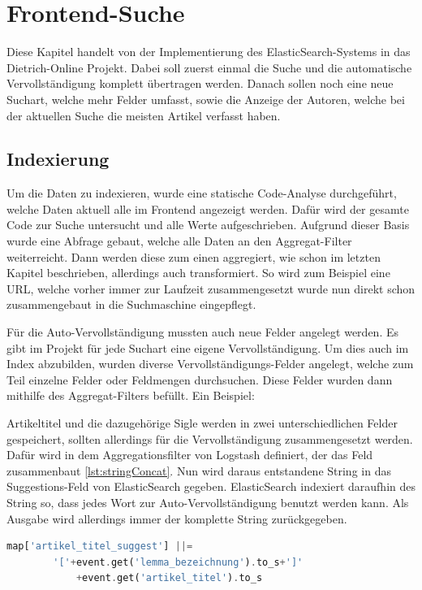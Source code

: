 \chapter{Frontend-Suche}

Diese Kapitel handelt von der Implementierung des ElasticSearch-Systems in das Dietrich-Online Projekt. Dabei soll zuerst einmal die Suche und die automatische Vervollständigung komplett übertragen werden. Danach sollen noch eine neue Suchart, welche mehr Felder umfasst, sowie die Anzeige der Autoren, welche bei der aktuellen Suche die meisten Artikel verfasst haben.

\section{Indexierung}

Um die Daten zu indexieren, wurde eine statische Code-Analyse durchgeführt, welche Daten aktuell alle im Frontend angezeigt werden. Dafür wird der gesamte Code zur Suche untersucht und alle Werte aufgeschrieben. Aufgrund dieser Basis wurde eine Abfrage gebaut, welche alle Daten an den Aggregat-Filter weiterreicht. Dann werden diese zum einen aggregiert, wie schon im letzten Kapitel beschrieben, allerdings auch transformiert. So wird zum Beispiel eine URL, welche vorher immer zur Laufzeit zusammengesetzt wurde nun direkt schon zusammengebaut in die Suchmaschine eingepflegt. 

Für die Auto-Vervollständigung mussten auch neue Felder angelegt werden. Es gibt im Projekt für jede Suchart eine eigene Vervollständigung. Um dies auch im Index abzubilden, wurden diverse Vervollständigungs-Felder angelegt, welche zum Teil einzelne Felder oder Feldmengen durchsuchen. Diese Felder wurden dann mithilfe des Aggregat-Filters befüllt. Ein Beispiel:

Artikeltitel und die dazugehörige Sigle werden in zwei unterschiedlichen Felder gespeichert, sollten allerdings für die Vervollständigung zusammengesetzt werden.
Dafür wird in dem Aggregationsfilter von Logstash definiert, der das Feld zusammenbaut \ref{lst:stringConcat}. Nun wird daraus entstandene String in das Suggestions-Feld von ElasticSearch gegeben. ElasticSearch indexiert daraufhin des String so, dass jedes Wort zur Auto-Vervollständigung benutzt werden kann. Als Ausgabe wird allerdings immer der komplette String zurückgegeben.

\begin{lstlisting}[language=PHP, frame=single, label={lst:stringConcat}] 
    map['artikel_titel_suggest'] ||= 
        '['+event.get('lemma_bezeichnung').to_s+']'
            +event.get('artikel_titel').to_s
\end{lstlisting}

